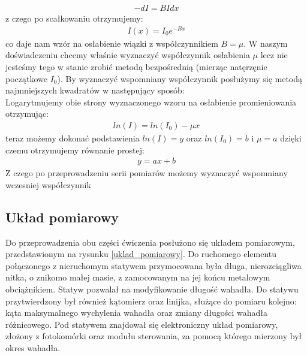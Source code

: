 \documentclass[a4paper]{article}
\newlength{\du}
\begin{document}
\begin{align*}
−dI = B I dx
\end{align*}
z czego po scałkowaniu otrzymujemy:
\begin{align*}
I ( x)=I_0 e^{−B x}
\end{align*}
co daje nam wzór na osłabienie wiązki z współczynnikiem $B = \mu$.
W naszym doświadczeniu chcemy właśnie wyznaczyć współczynnik osłabienia $\mu$ lecz nie jesteśmy tego w stanie zrobić metodą bezpośrednią (mierząc natęrzęnie początkowe $I_0$). By wyznaczyć wspomniany współczynnik posłużymy się metodą najmniejszych kwadratów w następujący sposób:\\
Logarytmujemy obie strony wyznaczonego wzoru na osłabienie promieniowania otrzymując:
\begin{align*}
ln( I )=ln( I_0 )−\mu x
\end{align*}
teraz możemy dokonać podstawienia $ln(I) = y$ oraz $ln (I_0 ) =b$ i $\mu = a$ dzięki czemu otrzymujemy równanie prostej:
\begin{align*}
y = ax + b
\end{align*}
Z czego po przeprowadzeniu serii pomiarów możemy wyznaczyć wspomniany wczesniej współczynnik



\subsection{Układ pomiarowy}
Do przeprowadzenia obu części ćwiczenia posłużono się układem pomiarowym,
przedstawionym na rysunku \ref{uklad_pomiarowy}. Do ruchomego elementu 
połączonego z nieruchomym statywem przymocowana była długa, nierozciągliwa nitka, 
o znikomo małej masie, z zamocowanym na jej końcu metalowym obciążnikiem. 
Statyw pozwalał na modyfikowanie długość wahadła. Do statywu 
przytwierdzony był również kątomierz oraz linijka, służące do pomiaru kolejno:
kąta maksymalnego wychylenia wahadła oraz zmiany długości wahadła różnicowego.
Pod statywem znajdował się elektroniczny układ pomiarowy, złożony z fotokomórki
oraz modułu sterowania, za pomocą którego mierzony był okres wahadła.
\end{document}
